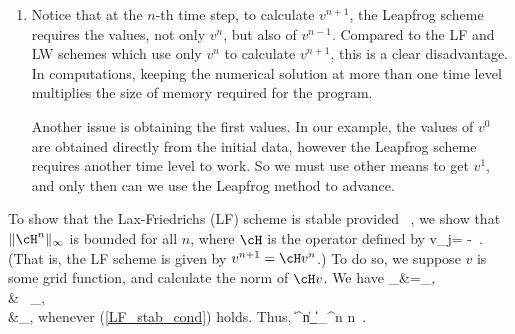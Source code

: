 \documentclass{article}
\begin{document}
\begin{exerciseList}
\begin{enumerate}
\item
Notice that at the $n$-th time step, to calculate $v^{n+1}$, the Leapfrog scheme requires the values, not only $v^n$, but also of $v^{n-1}$.
Compared to the LF and LW schemes which use only $v^n$ to calculate $v^{n+1}$, this is a clear disadvantage. In computations, keeping the numerical solution at more than one time level multiplies the size of memory required for the program.

Another issue is obtaining the first values. In our example, the values of $v^0$ are obtained directly from the initial data, however the Leapfrog scheme requires another time level to work.
So we must use other means to get $v^1$, and only then can we use the Leapfrog method to advance.
\end{enumerate}






\item
To show that the Lax-Friedrichs (LF) scheme is stable provided 
	\ , 
\eeq 
we show that $\|\cH^n\|_\infty$ is bounded for all $n$, where $\cH$ is the operator defined by
\beq
	\cH v_j= -\ .
\eeq
(That is, the LF scheme is given by $v^{n+1}=\cH v^n$.)
To do so, we suppose $v$ is some grid function, and calculate the norm of $\cH v$.
We have
\beqa	
	_\infty &=_\infty, \\
		&\le {} \ _\infty, \\
		&\le	{}_\infty,	 
\eeqa
whenever (\ref{LF_stab_cond}) holds. Thus, 
\beq 	
	\|\cH^n\|_\infty \le \|\cH\|_\infty^n 
	\qquad\qquad \forall n\in\N\ . 
\eeq





\end{exerciseList}
\end{document}

